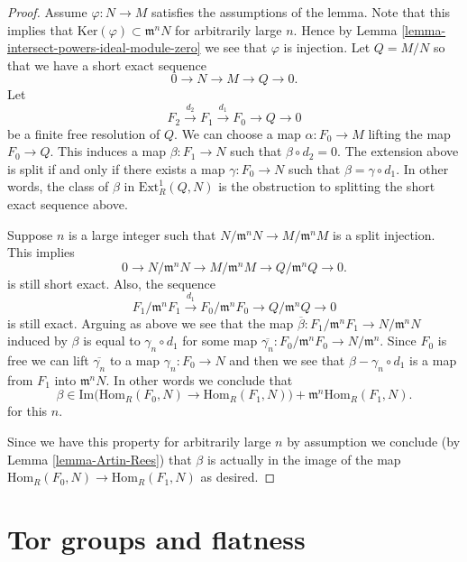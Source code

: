 \begin{proof}
Assume $\varphi : N \to M$ satisfies the assumptions of the lemma.
Note that this implies that $\text{Ker}(\varphi) \subset \mathfrak m^nN$
for arbitrarily large $n$. Hence by
Lemma \ref{lemma-intersect-powers-ideal-module-zero} we see that $\varphi$
is injection. Let $Q = M/N$ so that we have a short exact sequence
$$
0 \to N \to M \to Q \to 0.
$$
Let
$$
F_2 \xrightarrow{d_2} F_1 \xrightarrow{d_1} F_0 \to Q \to 0
$$
be a finite free resolution of $Q$. We can choose a map
$\alpha : F_0 \to M$ lifting the map $F_0 \to Q$. This induces a map
$\beta : F_1 \to N$ such that $\beta \circ d_2 = 0$. The extension
above is split if and only if there exists a map $\gamma : F_0 \to N$
such that $\beta = \gamma \circ d_1$. In other words, the class of
$\beta$ in $\text{Ext}^1_R(Q, N)$ is the obstruction to splitting
the short exact sequence above.

\medskip\noindent
Suppose $n$ is a large integer such that
$N/\mathfrak m^nN \to M/\mathfrak m^nM$ is a split injection.
This implies
$$
0 \to N/\mathfrak m^nN \to M/\mathfrak m^nM \to Q/\mathfrak m^nQ \to 0.
$$
is still short exact. Also, the sequence
$$
F_1/\mathfrak m^nF_1 \xrightarrow{d_1} F_0/\mathfrak m^nF_0
\to Q/\mathfrak m^nQ \to 0
$$
is still exact. Arguing as above we see that the map
$\overline{\beta} : F_1/\mathfrak m^nF_1 \to N/\mathfrak m^nN$
induced by $\beta$ is equal to $\gamma_n \circ d_1$ for some
map $\overline{\gamma_n} : F_0/\mathfrak m^nF_0 \to N/\mathfrak m^n$.
Since $F_0$ is free we can lift $\overline{\gamma_n}$ to a map
$\gamma_n : F_0 \to N$ and then we see that
$\beta - \gamma_n \circ d_1$ is a map from $F_1$ into $\mathfrak m^nN$.
In other words we conclude that
$$
\beta \in
\text{Im}\Big(\text{Hom}_R(F_0, N) \to \text{Hom}_R(F_1, N)\Big) +
\mathfrak m^n\text{Hom}_R(F_1, N).
$$
for this $n$.

\medskip\noindent
Since we have this property for arbitrarily large $n$ by assumption we
conclude (by Lemma \ref{lemma-Artin-Rees}) that $\beta$ is actually in
the image of the map $\text{Hom}_R(F_0, N) \to \text{Hom}_R(F_1, N)$ as
desired.
\end{proof}











\section{Tor groups and flatness}
\label{section-tor}

